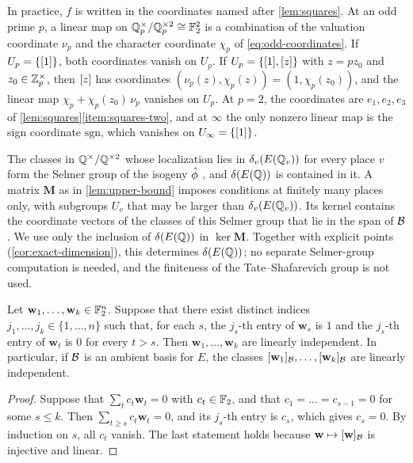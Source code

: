 In practice, $f$ is written in the coordinates named after \cref{lem:squares}. At an odd prime $p$, a linear map on $\mathbb Q_p^{\times}/\mathbb Q_p^{\times2}\cong\mathbb F_2^2$ is a combination of the valuation coordinate $\nu_p$ and the character coordinate $\chi_p$ of \eqref{eq:odd-coordinates}. If $U_p=\{[1]\}$, both coordinates vanish on $U_p$. If $U_p=\{[1],[z]\}$ with $z=pz_0$ and $z_0\in\mathbb Z_p^\times$, then $[z]$ has coordinates $(\nu_p(z),\chi_p(z))=(1,\chi_p(z_0))$, and the linear map $\chi_p+\chi_p(z_0)\,\nu_p$ vanishes on $U_p$. At $p=2$, the coordinates are $e_1,e_2,e_3$ of \cref{lem:squares}\ref{item:squares-two}, and at $\infty$ the only nonzero linear map is the sign coordinate $\mathrm{sgn}$, which vanishes on $U_\infty=\{[1]\}$.

\begin{remark}\label{rem:selmer}
The classes in $\mathbb Q^{\times}/\mathbb Q^{\times2}$ whose localization lies in $\delta_v(E(\mathbb Q_v))$ for every place $v$ form the Selmer group of the isogeny $\hat\phi$ \cite[Section~X.4]{SilvermanAEC}, and $\delta(E(\mathbb Q))$ is contained in it. A matrix $\mathbf M$ as in \cref{lem:upper-bound} imposes conditions at finitely many places only, with subgroups $U_v$ that may be larger than $\delta_v(E(\mathbb Q_v))$. Its kernel contains the coordinate vectors of the classes of this Selmer group that lie in the span of $\mathcal B$. We use only the inclusion of $\delta(E(\mathbb Q))$ in $\ker\mathbf M$. Together with explicit points (\cref{cor:exact-dimension}), this determines $\delta(E(\mathbb Q))$; no separate Selmer-group computation is needed, and the finiteness of the Tate--Shafarevich group is not used.
\end{remark}

\begin{lemma}\label{lem:independence}
Let $\mathbf w_1,\dots,\mathbf w_k\in\mathbb F_2^n$. Suppose that there exist distinct indices $j_1,\dots,j_k\in\{1,\dots,n\}$ such that, for each $s$, the $j_s$-th entry of $\mathbf w_s$ is $1$ and the $j_s$-th entry of $\mathbf w_t$ is $0$ for every $t>s$. Then $\mathbf w_1,\dots,\mathbf w_k$ are linearly independent. In particular, if $\mathcal B$ is an ambient basis for $E$, the classes $[\mathbf w_1]_{\mathcal B},\dots,[\mathbf w_k]_{\mathcal B}$ are linearly independent.
\end{lemma}

\begin{proof}
Suppose that $\sum_tc_t\mathbf w_t=0$ with $c_t\in\mathbb F_2$, and that $c_1=\dots=c_{s-1}=0$ for some $s\le k$. Then $\sum_{t\ge s}c_t\mathbf w_t=0$, and its $j_s$-th entry is $c_s$, which gives $c_s=0$. By induction on $s$, all $c_t$ vanish. The last statement holds because $\mathbf w\mapsto[\mathbf w]_{\mathcal B}$ is injective and linear.
\end{proof}

